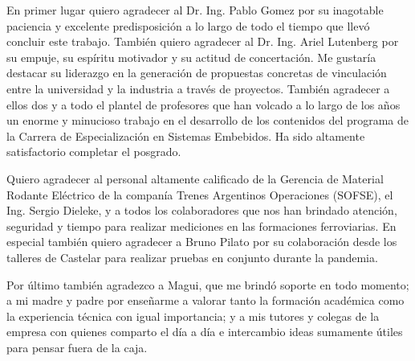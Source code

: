 \documentclass[
11pt, %
spanish,
singlespacing, %
parskip, %
headsepline, %
]{MastersDoctoralThesis} %
\begin{document}

\begin{acknowledgements}
\vspace{1.5cm}

En primer lugar quiero agradecer al Dr. Ing. Pablo Gomez por su inagotable paciencia y excelente predisposición a lo largo de todo el tiempo que llevó concluir este trabajo. También quiero agradecer al Dr. Ing. Ariel Lutenberg por su empuje, su espíritu motivador y su actitud de concertación. Me gustaría destacar su liderazgo en la generación de propuestas concretas de vinculación entre la universidad y la industria a través de proyectos. También agradecer a ellos dos y a todo el plantel de profesores que han volcado a lo largo de los años un enorme y minucioso trabajo en el desarrollo de los contenidos del programa de la Carrera de Especialización en Sistemas Embebidos. Ha sido altamente satisfactorio completar el posgrado.

Quiero agradecer al personal altamente calificado de la Gerencia de Material Rodante Eléctrico de la companía Trenes Argentinos Operaciones (SOFSE), el Ing. Sergio Dieleke, y a todos los colaboradores que nos han brindado atención, seguridad y tiempo para realizar mediciones en las formaciones ferroviarias. En especial también quiero agradecer a Bruno Pilato por su colaboración desde los talleres de Castelar para realizar pruebas en conjunto durante la pandemia. 

Por último también agradezco a Magui, que me brindó soporte en 
todo momento; a mi madre y padre por enseñarme a valorar tanto la formación académica como la experiencia técnica con igual importancia; y a mis tutores y colegas de la empresa con quienes comparto el día a día e intercambio ideas sumamente útiles para pensar fuera de la caja.


\end{acknowledgements}


\tableofcontents %
\end{document}
